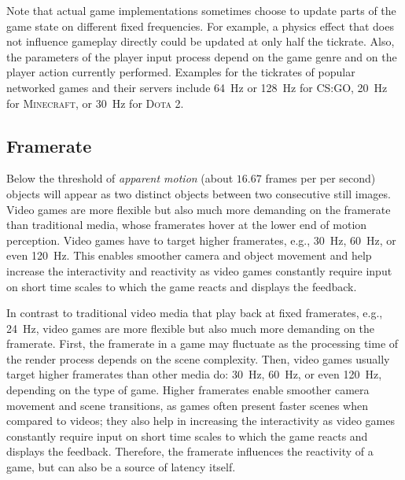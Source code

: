 
Note that actual game implementations sometimes choose to update parts of the game state on different fixed frequencies. For example, a physics effect that does not influence gameplay directly could be updated at only half the tickrate. Also, the parameters of the player input process depend on the game genre and on the player action currently performed. Examples for the tickrates of popular networked games and their servers include \SI{64}{\hertz} or \SI{128}{\hertz} for \textsc{CS:GO}, \SI{20}{\hertz} for \textsc{Minecraft}, or \SI{30}{\hertz} for \textsc{Dota 2}.


\subsection{Framerate}
\label{sec:framerate}


Below the threshold of \textit{apparent motion} (about $16.67$ frames per per second) objects will appear as two distinct objects between two consecutive still images. Video games are more flexible but also much more demanding on the framerate than traditional media, whose framerates hover at the lower end of motion perception. Video games have to target higher framerates, e.g., \SI{30}{\hertz}, \SI{60}{\hertz}, or even \SI{120}{\hertz}. This enables smoother camera and object movement and help increase the interactivity and reactivity as video games constantly require input on short time scales to which the game reacts and displays the feedback.


In contrast to traditional video media that play back at fixed framerates, e.g., \SI{24}{\hertz}, video games are more flexible but also much more demanding on the framerate. First, the framerate in a game may fluctuate as the processing time of the render process depends on the scene complexity. Then, video games usually target higher framerates than other media do: \SI{30}{\hertz}, \SI{60}{\hertz}, or even \SI{120}{\hertz}, depending on the type of game. Higher framerates enable smoother camera movement and scene transitions, as games often present faster scenes when compared to videos; they also help in increasing the interactivity as video games constantly require input on short time scales to which the game reacts and displays the feedback. Therefore, the framerate influences the reactivity of a game, but can also be a source of latency itself.

